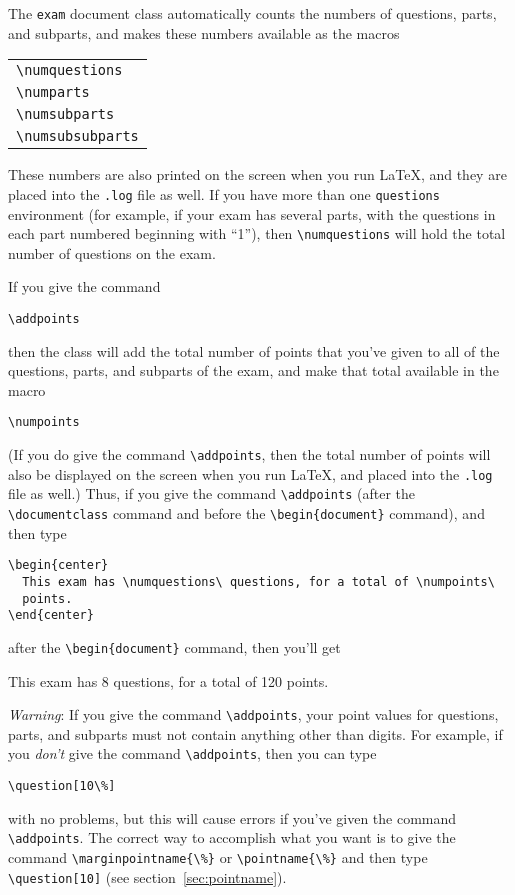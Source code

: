 \documentclass[12pt]{exam}
\begin{document}
The \verb"exam" document class automatically counts the numbers of
questions, parts, and subparts, and makes these numbers available as
the macros
\begin{center}
  \begin{tabular}{l}
    \verb"\numquestions"\\
    \verb"\numparts"\\
    \verb"\numsubparts"\\
    \verb"\numsubsubparts"
  \end{tabular}
\end{center}
These numbers are also printed on the screen when you run \LaTeX, and
they are placed into the \verb".log" file as well.  If you have more
than one \verb"questions" environment (for example, if your exam has
several parts, with the questions in each part numbered beginning with
``1''), then \verb"\numquestions" will hold the total number of
questions on the exam.

If you give the command
\begin{center}
  \verb"\addpoints"
\end{center}
then the class will add the total number of points that you've given
to all of the questions, parts, and subparts of the exam, and make
that total available in the macro
\begin{center}
  \verb"\numpoints"
\end{center}
(If you do give the command \verb"\addpoints", then the total number
of points will also be displayed on the screen when you run \LaTeX,
and placed into the \verb".log" file as well.)  Thus, if you give the
command \verb"\addpoints" (after the \verb"\documentclass" command and
before the \verb"\begin{document}" command), and then type
\begin{verbatim}
\begin{center}
  This exam has \numquestions\ questions, for a total of \numpoints\ 
  points.
\end{center}
\end{verbatim}
after the \verb"\begin{document}" command, then you'll get
\begin{center}
  This exam has 8 questions, for a total of 120 points.
\end{center}


\emph{Warning}: If you give the command \verb"\addpoints", your point
values for questions, parts, and subparts must not contain anything
other than digits.  For example, if you \emph{don't} give the command
\verb"\addpoints", then you can type
\begin{center}
  \verb"\question[10\%]"
\end{center}
with no problems, but this will cause errors if you've given the
command \verb"\addpoints".  The correct way to accomplish what you
want is to give the command \verb"\marginpointname{\%}" or
\verb"\pointname{\%}" and then type \verb"\question[10]" (see
section~\ref{sec:pointname}). 
\end{document}
